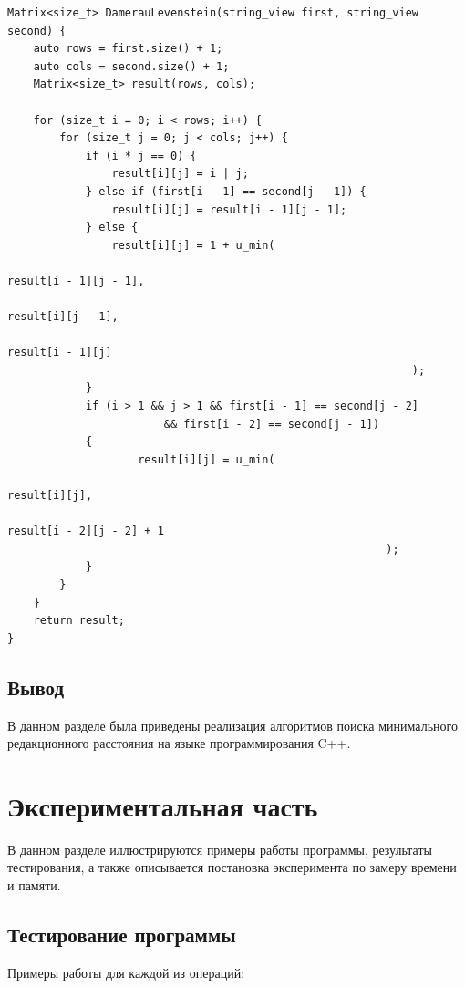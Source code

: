 \documentclass[12pt,a4paper,oneside]{report}
\begin{document}
\begin{lstlisting}[label=matrx_rec_leven,caption=Функция нахождения расстояния Дамерау-Левенштейна с использованием матрицы]
Matrix<size_t> DamerauLevenstein(string_view first, string_view second) {
	auto rows = first.size() + 1;
	auto cols = second.size() + 1;
	Matrix<size_t> result(rows, cols);
	
	for (size_t i = 0; i < rows; i++) {
		for (size_t j = 0; j < cols; j++) {
			if (i * j == 0) {
				result[i][j] = i | j;
			} else if (first[i - 1] == second[j - 1]) {
				result[i][j] = result[i - 1][j - 1];
			} else {
				result[i][j] = 1 + u_min(
																	result[i - 1][j - 1],
																	result[i][j - 1],
																	result[i - 1][j]
															  );
			}
			if (i > 1 && j > 1 && first[i - 1] == second[j - 2]
						&& first[i - 2] == second[j - 1])
			{
					result[i][j] = u_min(
																result[i][j],
																result[i - 2][j - 2] + 1
														  );
			}
		}
	}
	return result;
}
\end{lstlisting}


\section*{Вывод}
\qquad В данном разделе была приведены реализация алгоритмов поиска минимального редакционного расстояния на языке программирования C++.

\chapter{Экспериментальная часть}
\qquad В данном разделе иллюстрируются примеры работы программы, результаты тестирования, а также описывается постановка эксперимента по замеру времени и памяти. 
\section{Тестирование программы}
\qquad Примеры работы для каждой из операций:

\setcounter{figure}{4}
\renewcommand{\thesubfigure}{\arabic{subfigure}}
\end{document}
